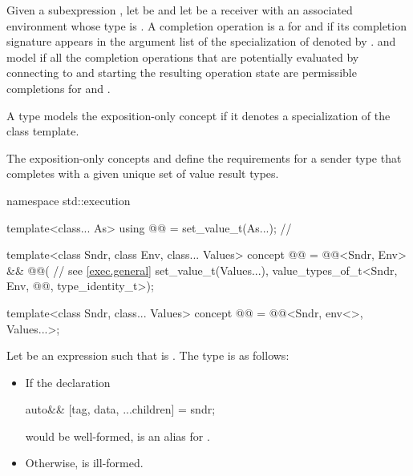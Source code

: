 \pnum
Given a subexpression ,
let  be  and
let  be a receiver
with an associated environment whose type is .
A completion operation is a 
for  and 
if its completion signature appears in the argument list of the specialization of  denoted by
.
 and  model 
if all the completion operations
that are potentially evaluated by connecting  to  and
starting the resulting operation state
are permissible completions for  and .

\pnum
A type models
the exposition-only concept 
if it denotes a specialization of
the  class template.

\pnum
The exposition-only concepts
 and 
define the requirements for a sender type
that completes with a given unique set of value result types.
\begin{codeblock}
namespace std::execution {
  template<class... As>
    using @@ = set_value_t(As...);             // \expos

  template<class Sndr, class Env, class... Values>
    concept @@ =
      @@<Sndr, Env> &&
      @@(                     // see \ref{exec.general}
        set_value_t(Values...),
        value_types_of_t<Sndr, Env, @@, type_identity_t>);

  template<class Sndr, class... Values>
    concept @@ = @@<Sndr, env<>, Values...>;
}
\end{codeblock}

\pnum
Let  be an expression
such that  is .
The type  is as follows:
\begin{itemize}
\item
If the declaration
\begin{codeblock}
auto&& [tag, data, ...children] = sndr;
\end{codeblock}
would be well-formed,  is
an alias for .
\item
Otherwise,  is ill-formed.
\end{itemize}

